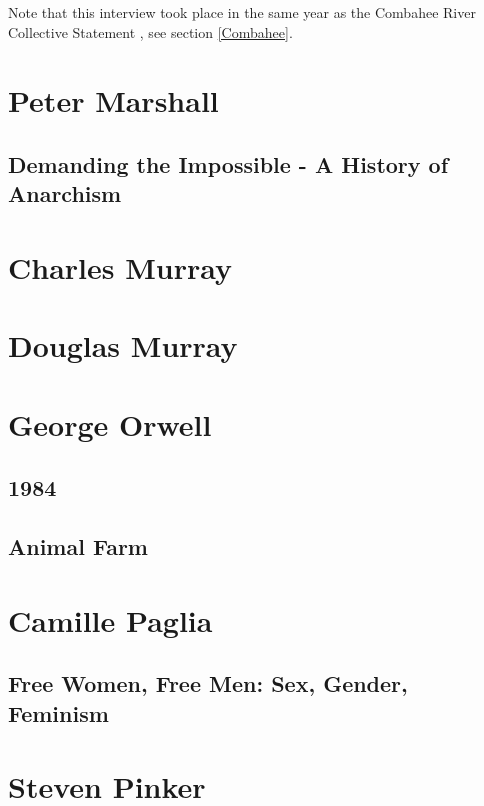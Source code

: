 \documentclass[10pt,titlepage]{book}
\begin{document}
Note that this interview took place in the same year as the Combahee River Collective Statement \cite{combahee-statement}, see section \ref{Combahee}.

\section{Peter Marshall}

\subsection{Demanding the Impossible - A History of Anarchism \cite{marshallHA}}

\section{Charles Murray \cite{murrayc-tbc,murrayc-hd}}

\section{Douglas Murray}

\cite{murrayd-vi,murrayd-sde,murrayd-tmc}

\section{George Orwell}

\subsection{1984}

\cite{orwell-1984}

\subsection{Animal Farm \cite{orwell-af}}

\section{Camille Paglia}

\subsection{Free Women, Free Men: Sex, Gender, Feminism \cite{paglia-fw}}

\section{Steven Pinker}
\end{document}
